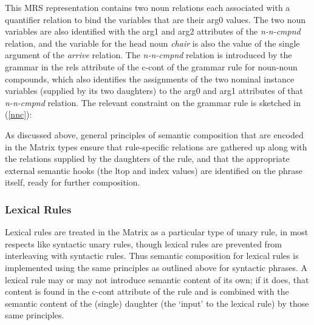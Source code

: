 \documentclass[12pt]{article}
\begin{document}
This MRS representation contains two noun relations each associated with
a quantifier relation to bind the variables that are their {\sc arg0} values.
The two noun variables are also identified with the 
{\sc arg1} and {\sc arg2} attributes of the {\it n-n-cmpnd} relation, and
the variable for the head noun {\it chair} is also the value of the single
argument of the {\it arrive} relation.  The {\it n-n-cmpnd} relation is 
introduced by the grammar in the {\sc rels} attribute of the {\sc c-cont} 
of the grammar rule for noun-noun compounds, which also identifies the 
assignments of the two nominal instance variables (supplied by its two
daughters) to the {\sc arg0} and {\sc arg1} attributes of that {\it n-n-cmpnd}
relation.  The relevant constraint on the grammar rule is sketched in
(\ref{nnc}):


As discussed above, general principles of semantic composition that
are encoded in the Matrix types ensure that rule-specific relations
are gathered up along with the relations supplied by the daughters of
the rule, and that the appropriate external semantic hooks (the {\sc
ltop} and {\sc index} values) are identified on the phrase itself,
ready for further composition.


\subsubsection{Lexical Rules}

Lexical rules are treated in the Matrix as a particular type of unary
rule, in most respects like syntactic unary rules, though lexical
rules are prevented from interleaving with syntactic rules.  Thus
semantic composition for lexical rules is implemented using the same
principles as outlined above for syntactic phrases.  A lexical rule
may or may not introduce semantic content of its own; if it does, that
content is found in the {\sc c-cont} attribute of the rule and is
combined with the semantic content of the (single) daughter (the
`input' to the lexical rule) by those same principles.
\end{document}
